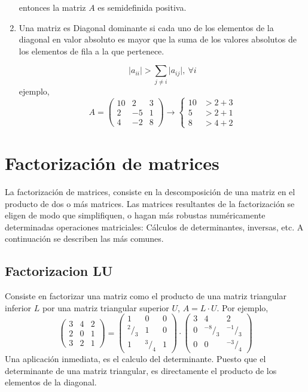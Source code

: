 \begin{enumerate}
entonces la matriz $A$ es semidefinida positiva.

\item Una matriz es Diagonal dominante si cada uno de los elementos de la diagonal en valor absoluto es mayor que la suma de los valores absolutos de los elementos de fila a la  que pertenece.

\begin{equation*}
\lvert a_{ii} \rvert > \sum_{j\neq i} \lvert a_{ij} \rvert, \ \forall i
\end{equation*}
ejemplo,
\begin{equation*}
A=\begin{pmatrix}
10& 2 & 3\\
2& -5 & 1\\
4& -2 & 8
\end{pmatrix}\rightarrow \left\{ \begin{aligned}
10& > 2+3\\
5&> 2+1\\
8& > 4+2
\end{aligned} \right. 
\end{equation*}

\end{enumerate}



\section{Factorización de matrices}\label{sec:fact}
La factorización de matrices, consiste en la descomposición de una matriz en el producto de dos o más matrices. Las matrices resultantes de la factorización se eligen de modo que simplifiquen, o hagan más robustas numéricamente determinadas operaciones matriciales: Cálculos de determinantes, inversas, etc. A continuación se describen las más comunes.

\subsection{Factorizacion LU}\label{sec:LU}
Consiste en factorizar una matriz como el producto de una matriz triangular inferior $L$ por una  matriz triangular superior $U$, $A=L\cdot U$. Por ejemplo,
\begin{equation*}
\begin{pmatrix}
3& 4& 2\\
2& 0& 1\\
3& 2& 1
\end{pmatrix} = \begin{pmatrix}
1& 0& 0\\
^2/_3 & 1& 0\\
1& ^3/_4& 1
\end{pmatrix}\cdot \begin{pmatrix}
3& 4& 2\\
0& ^{-8}/_3& ^{-1}/_3\\
0& 0& ^{-3}/_4
\end{pmatrix}
\end{equation*}
Una aplicación inmediata, es el calculo del determinante. Puesto que el determinante de una matriz triangular, es directamente el producto de los elementos de la diagonal.

